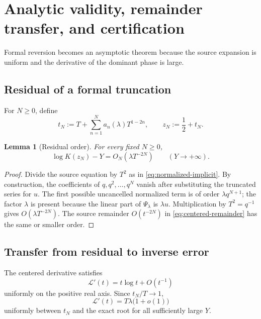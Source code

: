 \documentclass[11pt,oneside]{article}
\theoremstyle{plain}
\newtheorem{lemma}[theorem]{Lemma}
\theoremstyle{definition}
\theoremstyle{remark}
\newcommand{\Lcal}{\mathcal{L}}
\begin{document}
\section{Analytic validity, remainder transfer, and certification}
\label{sec:analytic-validity}

Formal reversion becomes an asymptotic theorem because the source expansion is
uniform and the derivative of the dominant phase is large.

\subsection{Residual of a formal truncation}

For \(N\ge0\), define
\begin{equation}
 t_N:=T+\sum_{n=1}^{N}a_n(\lambda)T^{1-2n},
 \qquad
 z_N:=\frac12+t_N.
 \label{eq:tN-zN}
\end{equation}

\begin{lemma}[Residual order]
\label{lem:residual-order}
For every fixed \(N\ge0\),
\begin{equation}
 \log K(z_N)-Y=O_N(\lambda T^{-2N})
 \qquad(Y\to+\infty).
 \label{eq:residual-order}
\end{equation}
\end{lemma}

\begin{proof}
Divide the source equation by \(T^2\) as in
\cref{eq:normalized-implicit}.  By construction, the coefficients of
\(q,q^2,\ldots,q^N\) vanish after substituting the truncated series for \(u\).
The first possible uncancelled normalized term is of order
\(\lambda q^{N+1}\); the factor \(\lambda\) is present because the linear
part of \(\Psi_\lambda\) is \(\lambda u\).  Multiplication by
\(T^2=q^{-1}\) gives \(O(\lambda T^{-2N})\).  The source remainder
\(O(t^{-2N})\) in \cref{eq:centered-remainder} has the same or smaller order.
\end{proof}

\subsection{Transfer from residual to inverse error}

The centered derivative satisfies
\begin{equation}
 \Lcal'(t)=t\log t+O(t^{-1})
 \label{eq:Lprime-leading}
\end{equation}
uniformly on the positive real axis.  Since \(t_N/T\to1\),
\begin{equation}
 \Lcal'(t)=T\lambda\bigl(1+o(1)\bigr)
 \label{eq:Lprime-near-T}
\end{equation}
uniformly between \(t_N\) and the exact root for all sufficiently large
\(Y\).
\end{document}
